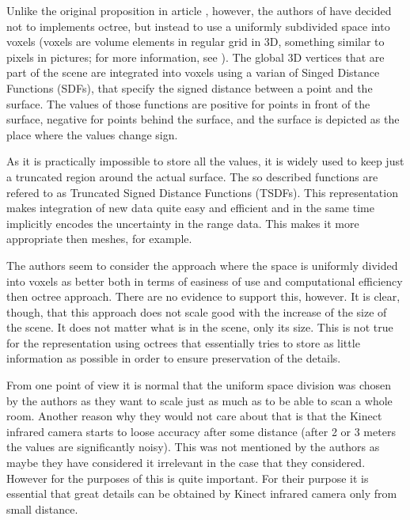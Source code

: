 \documentclass[11pt, a4paper]{article}
\theoremstyle{plain}
\begin{document}
    Unlike the original proposition in article
    \cite{representaion-and-rendering-of-implicit-surfaces}, however, the
    authors of \cite{kinectfusion} have decided not to implements octree, but
    instead to use a uniformly subdivided space into voxels (voxels are
    volume elements in regular grid in 3D, something similar to pixels in
    pictures; for more information, see \cite{voxel}). The global 3D vertices
    that are part of the scene are integrated into voxels using a varian of
    Singed Distance Functions (SDFs), that specify the signed distance between a
    point and the surface. The values of those functions are positive for points
    in front of the surface, negative for points behind the surface, and the
    surface is depicted as the place where the values change sign. 

    As it is practically impossible to store all the values, it is widely used
    to keep just a truncated region around the actual surface. The so described
    functions are refered to as Truncated Signed Distance Functions (TSDFs).
    This representation makes integration of new data quite easy and efficient
    and in the same time implicitly encodes the uncertainty in the range data.
    This makes it more appropriate then meshes, for example.

    The authors seem to consider the approach where the space is uniformly
    divided into voxels as better both in terms of easiness of use and
    computational efficiency then octree approach. There are no evidence to
    support this, however. It is clear, though, that this approach does not
    scale good with the increase of the size of the scene. It does not matter
    what is in the scene, only its size. This is not true for the representation
    using octrees that essentially tries to store as little information as
    possible in order to ensure preservation of the details.

    From one point of view it is normal that the uniform space division was
    chosen by the authors as they want to scale just as much as to be able to
    scan a whole room.  Another reason why they would not care about that is
    that the Kinect infrared camera starts to loose accuracy after some distance
    (after 2 or 3 meters the values are significantly noisy). This was not
    mentioned by the authors as maybe they have considered it irrelevant in the
    case that they considered. However for the purposes of \cite{body-scanning}
    this is quite important. For their purpose it is essential that great
    details can be obtained by Kinect infrared camera only from small distance.
\end{document}
